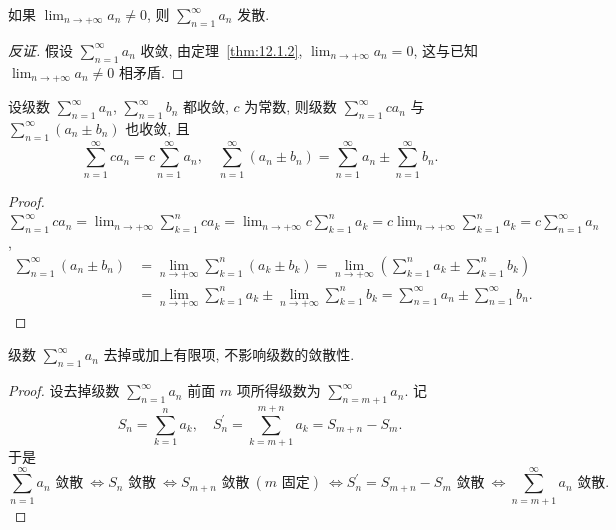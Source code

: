 \begin{corollary}\label{cor:12.1.1}
如果 $\lim_{n\to+\infty}a_{n}\neq0$, 则 $\sum_{n=1}^{\infty}a_{n}$ 发散.
\end{corollary}

\begin{proof}
[反证] 假设 $\sum_{n=1}^{\infty}a_{n}$ 收敛, 由定理~\ref{thm:12.1.2}, $\lim_{n\to+\infty}a_{n}=0$, 这与已知 $\lim_{n\to+\infty}a_{n}\neq0$ 相矛盾.
\end{proof}

\begin{theorem}[级数收敛的简单性质]\label{thm:12.1.3}
设级数 $\sum_{n=1}^{\infty}a_{n}$, $\sum_{n=1}^{\infty}b_{n}$ 都收敛, $c$ 为常数, 则级数 $\sum_{n=1}^{\infty}ca_{n}$ 与 $\sum_{n=1}^{\infty}(a_{n}\pm b_{n})$ 也收敛, 且
\[
  \sum_{n=1}^{\infty}ca_{n}=c\sum_{n=1}^{\infty}a_{n},\quad\sum_{n=1}^{\infty}(a_{n}\pm b_{n})=\sum_{n=1}^{\infty}a_{n}\pm\sum_{n=1}^{\infty}b_{n}.
\]
\end{theorem}

\begin{proof}
$\sum_{n=1}^{\infty}ca_{n}=\lim_{n\to+\infty}\sum_{k=1}^{n}ca_{k}=\lim_{n\to+\infty}c\sum_{k=1}^{n}a_{k}=c\lim_{n\to+\infty}\sum_{k=1}^{n}a_{k}=c\sum_{n=1}^{\infty}a_{n}$,
\begin{align*}
\sum_{n=1}^{\infty}(a_{n}\pm b_{n})
  &=\lim_{n\to+\infty}\sum_{k=1}^{n}(a_{k}\pm b_{k})
   =\lim_{n\to+\infty}\left(\sum_{k=1}^{n}a_{k}\pm\sum_{k=1}^{n}b_{k}\right) \\
  &=\lim_{n\to+\infty}\sum_{k=1}^{n}a_{k}\pm\lim_{n\to+\infty}\sum_{k=1}^{n}b_{k}
   =\sum_{n=1}^{\infty}a_{n}\pm\sum_{n=1}^{\infty}b_{n}.
\end{align*}
\end{proof}

\begin{theorem}\label{thm:12.1.4}
级数 $\sum_{n=1}^{\infty}a_{n}$ 去掉或加上有限项, 不影响级数的敛散性.
\end{theorem}

\begin{proof}
设去掉级数 $\sum_{n=1}^{\infty}a_{n}$ 前面 $m$ 项所得级数为 $\sum_{n=m+1}^{\infty}a_{n}$. 记
\[
  S_{n}=\sum_{k=1}^{n}a_{k},\quad S_{n}^{\prime}=\sum_{k=m+1}^{m+n}a_{k}=S_{m+n}-S_{m}.
\]
于是
\[
  \sum_{n=1}^{\infty}a_{n}\text{ 敛散}\ \Leftrightarrow S_{n}\text{ 敛散}\ \Leftrightarrow S_{m+n}\text{ 敛散}\ (m\text{ 固定})\ \Leftrightarrow S_{n}^{\prime}=S_{m+n}-S_{m}\text{ 敛散}\ \Leftrightarrow \sum_{n=m+1}^{\infty}a_{n}\text{ 敛散}.
\]
\end{proof}

